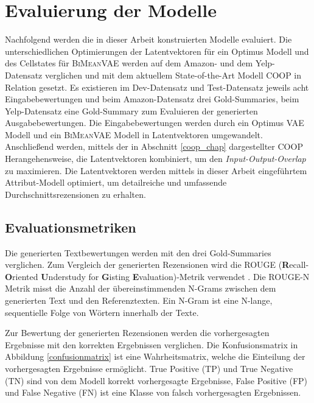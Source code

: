 \section{Evaluierung der Modelle}\raggedbottom
\label{evalmetric}
Nachfolgend werden die in dieser Arbeit konstruierten Modelle evaluiert.
Die unterschiedlichen Optimierungen der Latentvektoren für ein Optimus Modell und des Cellstates für \textsc{BiMeanVAE} werden auf dem Amazon- und dem Yelp-Datensatz verglichen und mit dem aktuellem State-of-the-Art Modell COOP in Relation gesetzt.
Es existieren im Dev-Datensatz und Test-Datensatz jeweils acht Eingabebewertungen und beim Amazon-Datensatz drei Gold-Summaries, beim Yelp-Datensatz eine Gold-Summary zum Evaluieren der generierten Ausgabebewertungen.
Die Eingabebewertungen werden durch ein Optimus VAE Modell und ein \textsc{BiMeanVAE} Modell in Latentvektoren umgewandelt.
Anschließend werden, mittels der in Abschnitt \ref{coop_chap} dargestellter COOP Herangehensweise, die Latentvektoren kombiniert, um den \textit{Input-Output-Overlap} zu maximieren. 
Die Latentvektoren werden mittels in dieser Arbeit eingeführtem Attribut-Modell optimiert, um detailreiche und umfassende Durchschnittsrezensionen zu erhalten.

\subsection{Evaluationsmetriken}
\label{eval_metrics_chapter}
Die generierten Textbewertungen werden mit den drei Gold-Summaries verglichen.
Zum Vergleich der generierten Rezensionen wird die ROUGE (\textbf{R}ecall-\textbf{O}riented \textbf{U}nderstudy for \textbf{G}isting \textbf{E}valuation)-Metrik verwendet \citep{lin-2004-rouge}.
Die ROUGE-N Metrik misst die Anzahl der übereinstimmenden N-Grams zwischen dem generierten Text und den Referenztexten. 
Ein N-Gram ist eine N-lange, sequentielle Folge von Wörtern innerhalb der Texte. 

Zur Bewertung der generierten Rezensionen werden die vorhergesagten Ergebnisse mit den korrekten Ergebnissen verglichen. 
Die Konfusionsmatrix in Abbildung \ref{confusionmatrix} ist eine Wahrheitsmatrix, welche die Einteilung der vorhergesagten Ergebnisse ermöglicht. 
True Positive (TP) und True Negative (TN) sind von dem Modell korrekt vorhergesagte Ergebnisse, False Positive (FP) und False Negative (FN) ist eine Klasse von falsch vorhergesagten Ergebnissen.



